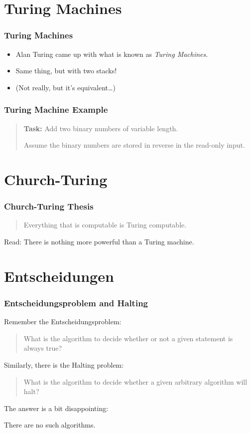 \documentclass[mathserif]{beamer}
\begin{document}
\section{Turing Machines}
\begin{frame}
  \frametitle{Turing Machines}

  \begin{itemize}
    \item Alan Turing came up with what is known as \emph{Turing Machines}.

    \item Same thing, but with two stacks!

    \item (Not really, but it's equivalent\ldots)
  \end{itemize}
\end{frame}

\begin{frame}
  \frametitle{Turing Machine Example}

  \begin{quote}
    \textbf{Task:} Add two binary numbers of variable length. 

    Assume the binary numbers are stored in reverse in the read-only input.
  \end{quote}
\end{frame}

\section{Church-Turing}
\begin{frame}
  \frametitle{Church-Turing Thesis}

  \begin{quote}
    Everything that is computable is Turing computable.
  \end{quote}

  Read: There is nothing more powerful than a Turing machine.
\end{frame}

\section{Entscheidungen}
\begin{frame}
  \frametitle{Entscheidungsproblem and Halting}

  Remember the Entscheidungsproblem:
  \begin{quote}
    What is the algorithm to decide whether or not a given statement is always
    true?
  \end{quote}

  Similarly, there is the Halting problem:
  \begin{quote}
    What is the algorithm to decide whether a given arbitrary algorithm will
    halt?
  \end{quote}

  The answer is a bit disappointing:

  {\Large There are no such algorithms.}

\end{frame}
\end{document}

